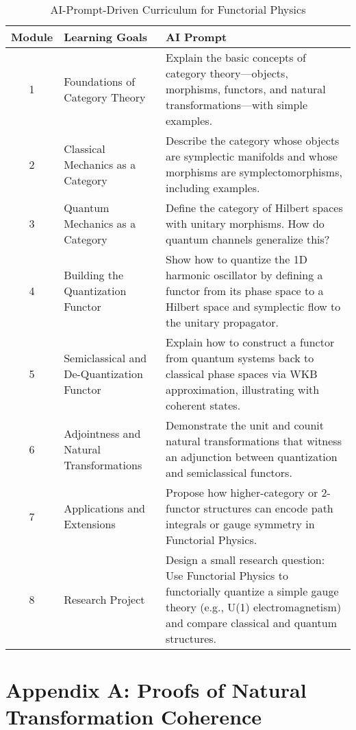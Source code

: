 \documentclass[11pt]{article}
\begin{document}
\begin{table}[ht]
  \centering
  \renewcommand{\arraystretch}{1.3}
  \begin{tabularx}{\textwidth}{c>{\raggedright\arraybackslash}X>{\raggedright\arraybackslash}X}
    \toprule
    \textbf{Module} & \textbf{Learning Goals} & \textbf{AI Prompt} \\
    \midrule
    1 & Foundations of Category Theory & Explain the basic concepts of category theory—objects, morphisms, functors, and natural transformations—with simple examples. \\
    2 & Classical Mechanics as a Category & Describe the category whose objects are symplectic manifolds and whose morphisms are symplectomorphisms, including examples. \\
    3 & Quantum Mechanics as a Category & Define the category of Hilbert spaces with unitary morphisms. How do quantum channels generalize this? \\
    4 & Building the Quantization Functor & Show how to quantize the 1D harmonic oscillator by defining a functor from its phase space to a Hilbert space and symplectic flow to the unitary propagator. \\
    5 & Semiclassical and De-Quantization Functor & Explain how to construct a functor from quantum systems back to classical phase spaces via WKB approximation, illustrating with coherent states. \\
    6 & Adjointness and Natural Transformations & Demonstrate the unit and counit natural transformations that witness an adjunction between quantization and semiclassical functors. \\
    7 & Applications and Extensions & Propose how higher-category or 2-functor structures can encode path integrals or gauge symmetry in Functorial Physics. \\
    8 & Research Project & Design a small research question: Use Functorial Physics to functorially quantize a simple gauge theory (e.g., U(1) electromagnetism) and compare classical and quantum structures. \\
    \bottomrule
  \end{tabularx}
  \caption{AI-Prompt-Driven Curriculum for Functorial Physics}
  \label{tab:curriculum}
\end{table}

\newpage
\section*{Appendix A: Proofs of Natural Transformation Coherence}
\label{appendixA}
\end{document}
